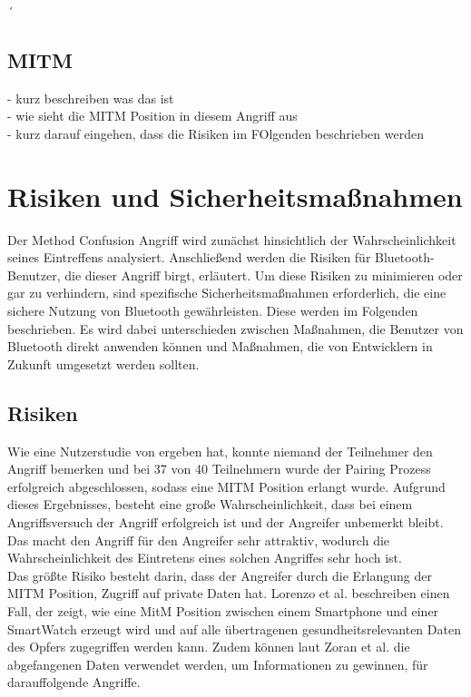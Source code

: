 ´\documentclass[
    a4paper,
    pagesize,
    pdftex,
    12pt,
]{scrartcl}
\begin{document}
    \subsection{MITM}
    - kurz beschreiben was das ist \\
    - wie sieht die MITM Position in diesem Angriff aus \\
    - kurz darauf eingehen, dass die Risiken im FOlgenden beschrieben werden

    \newpage
    \section{Risiken und Sicherheitsmaßnahmen}
    Der Method Confusion Angriff wird zunächst hinsichtlich der Wahrscheinlichkeit seines Eintreffens analysiert. Anschließend werden die Risiken für Bluetooth-Benutzer, die dieser Angriff birgt, erläutert.
    Um diese Risiken zu minimieren oder gar zu verhindern, sind spezifische Sicherheitsmaßnahmen erforderlich, die eine sichere Nutzung von Bluetooth gewährleisten. Diese werden im Folgenden beschrieben. Es wird dabei unterschieden zwischen Maßnahmen, die Benutzer von Bluetooth direkt anwenden können und Maßnahmen, die von Entwicklern in Zukunft umgesetzt werden sollten.

   \subsection{Risiken}
   Wie eine Nutzerstudie von \cite{method_confusion_attack} ergeben hat, konnte niemand der Teilnehmer den Angriff bemerken und bei 37 von 40 Teilnehmern wurde der Pairing Prozess erfolgreich abgeschlossen, sodass eine MITM Position erlangt wurde. Aufgrund dieses Ergebnisses, besteht eine große Wahrscheinlichkeit, dass bei einem Angriffsversuch der Angriff erfolgreich ist und der Angreifer unbemerkt bleibt. Das macht den Angriff für den Angreifer sehr attraktiv, wodurch die Wahrscheinlichkeit des Eintretens eines solchen Angriffes sehr hoch ist. \\
   Das größte Risiko besteht darin, dass der Angreifer durch die Erlangung der MITM Position, Zugriff auf private Daten hat. Lorenzo et al. \cite{technologies7010015} beschreiben einen Fall, der zeigt, wie eine MitM Position zwischen einem Smartphone und einer SmartWatch erzeugt wird und auf alle übertragenen gesundheitsrelevanten Daten des Opfers zugegriffen werden kann. Zudem können laut Zoran et al. \cite{weitere_risiken} die abgefangenen Daten verwendet werden, um Informationen zu gewinnen, für darauffolgende Angriffe.
   
\end{document}
